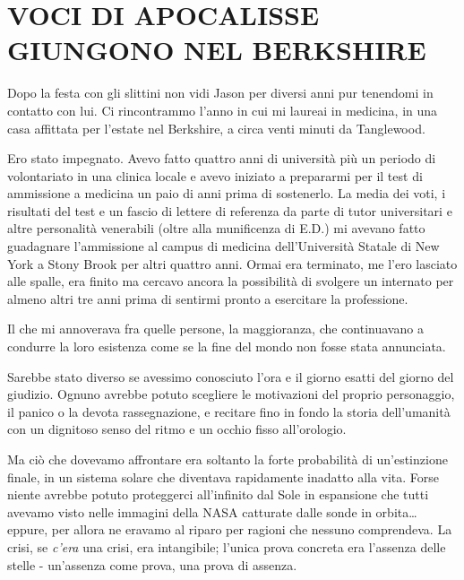 \chapter{VOCI DI APOCALISSE GIUNGONO NEL BERKSHIRE}\label{voci-di-apocalisse-giungono-nel-berkshire}

Dopo la festa con gli slittini non vidi Jason per diversi anni pur
tenendomi in contatto con lui. Ci rincontrammo l'anno in cui mi laureai
in medicina, in una casa affittata per l'estate nel Berkshire, a circa
venti minuti da Tanglewood.

Ero stato impegnato. Avevo fatto quattro anni di università più un
periodo di volontariato in una clinica locale e avevo iniziato a
prepararmi per il test di ammissione a medicina un paio di anni prima di
sostenerlo. La media dei voti, i risultati del test e un fascio di
lettere di referenza da parte di tutor universitari e altre personalità
venerabili (oltre alla munificenza di E.D.) mi avevano fatto guadagnare
l'ammissione al campus di medicina dell'Università Statale di New York a
Stony Brook per altri quattro anni. Ormai era terminato, me l'ero
lasciato alle spalle, era finito ma cercavo ancora la possibilità di
svolgere un internato per almeno altri tre anni prima di sentirmi pronto
a esercitare la professione.

Il che mi annoverava fra quelle persone, la maggioranza, che
continuavano a condurre la loro esistenza come se la fine del mondo non
fosse stata annunciata.

Sarebbe stato diverso se avessimo conosciuto l'ora e il giorno esatti
del giorno del giudizio. Ognuno avrebbe potuto scegliere le motivazioni
del proprio personaggio, il panico o la devota rassegnazione, e recitare
fino in fondo la storia dell'umanità con un dignitoso senso del ritmo e
un occhio fisso all'orologio.

Ma ciò che dovevamo affrontare era soltanto la forte probabilità di
un'estinzione finale, in un sistema solare che diventava rapidamente
inadatto alla vita. Forse niente avrebbe potuto proteggerci all'infinito
dal Sole in espansione che tutti avevamo visto nelle immagini della NASA
catturate dalle sonde in orbita\ldots{} eppure, per allora ne eravamo al
riparo per ragioni che nessuno comprendeva. La crisi, se \emph{c'era}
una crisi, era intangibile; l'unica prova concreta era l'assenza delle
stelle - un'assenza come prova, una prova di assenza.

